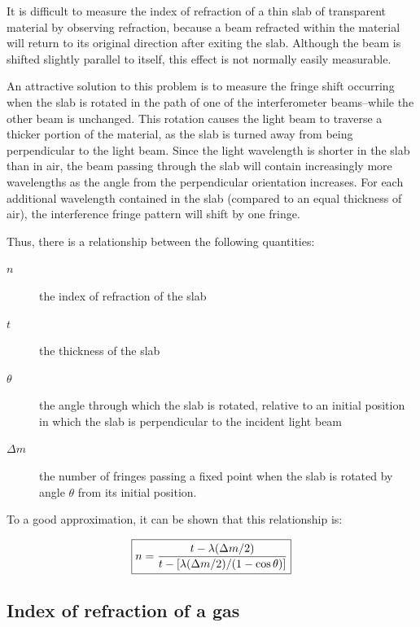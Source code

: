 \documentclass{tufte-handout}
\begin{document}
It is difficult to measure the index of refraction of a thin slab of transparent
material by observing refraction, because a beam refracted within the material
will return to its original direction after exiting the slab. Although the beam is
shifted slightly parallel to itself, this effect is not normally easily
measurable. 

An attractive solution to this problem is to measure the fringe shift occurring
when the slab is rotated in the path of one of the interferometer beams--while
the other beam is unchanged.  This rotation causes the light beam to traverse a
thicker portion of the material, as the slab is turned away from being
perpendicular to the light beam. Since the light wavelength is shorter in the
slab than in air, the beam passing through the slab will contain
increasingly more wavelengths as the angle from the perpendicular orientation
increases. For each additional wavelength contained in the slab (compared to an
equal thickness of air), the interference fringe pattern will shift by one
fringe.

Thus, there is a relationship between the following quantities:
\begin{description}
\item[$n$]  the index of refraction of the slab
\item[$t$]  the thickness of the slab
\item[$\theta$]  the angle through which the slab is rotated, relative to an  initial position in which the slab is perpendicular to the  incident light beam
\item[$\Delta m$]  the number of fringes passing a fixed point when the slab 
is  rotated by angle \ensuremath{\theta} from its initial position.
\end{description}

To a good approximation, it can be shown that this relationship is: 

\begin{equation}
\boxed{ n = { t - \lambda ( \Delta m/2) \over t - \left[ \lambda ( \Delta
      m/2)/(1-\cos\theta) \right] } 
\label{eq:glassslide}}
\end{equation}

\subsection{Index of refraction of a gas}
\end{document}
